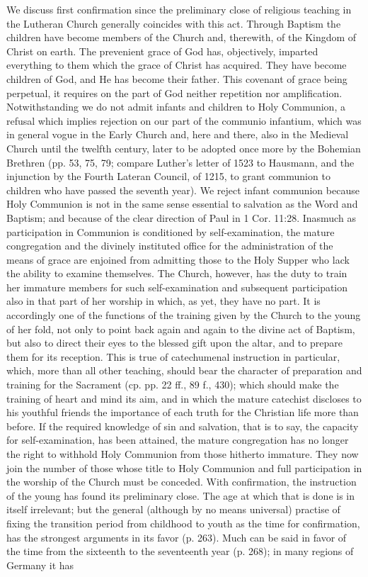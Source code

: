 We discuss first confirmation since the preliminary close of religious teaching in the Lutheran Church generally coincides with this act. Through Baptism the children have become members of the Church and, therewith, of the Kingdom of Christ on earth. The prevenient grace of God has, objectively, imparted everything to them which the grace of Christ has acquired. They have become children of God, and He has become their father. This covenant of grace being perpetual, it requires on the part of God neither repetition nor amplification. Notwithstanding we do not admit infants and children to Holy Communion, a refusal which implies rejection on our part of the communio infantium, which was in general vogue in the Early Church and, here and there, also in the Medieval Church until the twelfth century, later to be adopted once more by the Bohemian Brethren (pp. 53, 75, 79; compare Luther's letter of 1523 to Hausmann, and the injunction by the Fourth Lateran Council, of 1215, to grant communion to children who have passed the seventh year). We reject infant communion because Holy Communion is not in
the same sense essential to salvation as the Word and Baptism; and because of the clear direction of Paul in 1 Cor. 11:28. Inasmuch as participation in Communion is conditioned by self-examination, the mature congregation and the divinely instituted office for the administration of the means of grace are enjoined from admitting those to the Holy Supper who lack the ability to examine themselves. The Church, however, has the duty to train her immature members for such self-examination and subsequent participation also in that part of her worship in which, as yet, they have no part. It is accordingly one of the functions of the training given by the Church to the young of her fold, not only to point back again and again to the divine act of Baptism, but also to direct their eyes to the blessed gift upon the altar, and to prepare them for its reception. This is true of catechumenal instruction in particular, which, more than all other teaching, should bear the character of preparation and training for the Sacrament (cp. pp. 22 ff., 89 f., 430); which should make the training of heart and mind its aim, and in which the mature catechist discloses to his youthful friends the importance of each truth for the Christian life more than before. If the required knowledge of sin and salvation, that is to say, the capacity for self-examination, has been attained, the mature congregation has no longer the right to withhold Holy Communion from those hitherto immature. They now join the number of those whose title to Holy Communion and full participation in the worship of the Church must be conceded. With confirmation, the instruction of the young has found its preliminary close. The age at which that is done is in itself irrelevant; but the general (although by no means universal) practise of fixing the transition period from childhood to youth as the time for confirmation, has the strongest arguments in its favor (p. 263). Much can be said in favor of the time from the sixteenth to the seventeenth year (p. 268); in many regions of Germany it has

